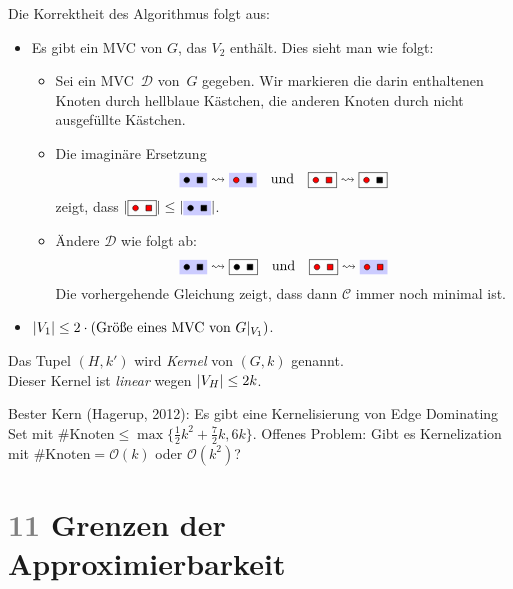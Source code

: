 \documentclass{cheat-sheet}
\newcommand{\size}[1]{\abs{#1}} %
\renewcommand{\O}{\mathcal{O}} %
\newcommand{\KCircleUnsel}{\tikz{\draw [fill=black] (0,0) circle (2pt);}}
\newcommand{\KSquareUnsel}{\tikz{\draw [fill=black] (0,0) rectangle (4pt, 4pt);}}
\newcommand{\KCircleSel}{\tikz{\draw [fill=red] (0,0) circle (2pt);}}
\newcommand{\KSquareSel}{\tikz{\draw [fill=red] (0,0) rectangle (4pt, 4pt);}}
\newcommand{\scriptSection}[1]{\textcolor{gray}{#1}\enspace}
\begin{document}
Die Korrektheit des Algorithmus folgt aus:
\begin{itemize}
  \item Es gibt ein MVC von $G$, das $V_2$ enthält. Dies sieht man wie folgt:
    \begin{itemize}
      \item Sei ein MVC~$\mathcal{D}$ von~$G$ gegeben. Wir markieren die darin enthaltenen Knoten durch hellblaue Kästchen, die anderen Knoten durch nicht ausgefüllte Kästchen.
      \item Die imaginäre Ersetzung
        \[
          \colorbox{blue!20}{\KCircleUnsel \enspace \KSquareUnsel} \rightsquigarrow \colorbox{blue!20}{\KCircleSel \enspace \KSquareUnsel}
          \quad \text{und} \quad
          \framebox{\KCircleSel \enspace \KSquareSel} \rightsquigarrow \framebox{\KCircleSel \enspace \KSquareUnsel}
        \]
        zeigt, dass $\size{\framebox{\KCircleSel \enspace \KSquareSel}} \leq \size{\colorbox{blue!20}{\KCircleUnsel \enspace \KSquareUnsel}}$.
      \item
        Ändere $\mathcal{D}$ wie folgt ab:
        \[
          \colorbox{blue!20}{\KCircleUnsel \enspace \KSquareUnsel} \rightsquigarrow \framebox{\KCircleUnsel \enspace \KSquareUnsel}
          \quad \text{und} \quad
          \framebox{\KCircleSel \enspace \KSquareSel} \rightsquigarrow \colorbox{blue!20}{\KCircleSel \enspace \KSquareSel}
        \]
        Die vorhergehende Gleichung zeigt, dass dann $\mathcal{C}$ immer noch minimal ist.
    \end{itemize}
  \item $\size{V_1} \leq 2 \cdot (\text{Größe eines MVC von $G|_{V_1}$})$.
\end{itemize}

\begin{bem}
  Das Tupel $(H, k')$ wird \textit{Kernel} von $(G, k)$ genannt. \\
  Dieser Kernel ist \textit{linear} wegen $\size{V_H} \leq 2 k$.
\end{bem}

Bester Kern (Hagerup, 2012): Es gibt eine Kernelisierung von Edge Dominating Set mit $\#\text{Knoten} \leq \max \{ \tfrac{1}{2} k^2 + \tfrac{7}{2} k, 6 k \}$.
Offenes Problem: Gibt es Kernelization mit $\#\text{Knoten} = \O(k)$ oder $\O(k^2)$?

\section{\scriptSection{11} Grenzen der Approximierbarkeit}
\end{document}
